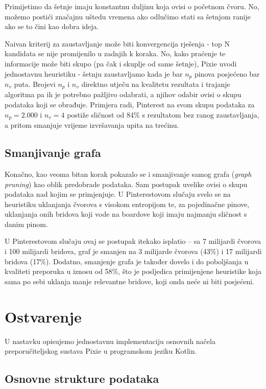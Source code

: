 \documentclass[times, utf8, seminar]{fer}
\begin{document}
Primijetimo da šetnje imaju konstantnu duljinu koja ovisi o početnom čvoru. No, možemo postići značajnu uštedu vremena ako odlučimo stati sa šetnjom ranije ako se to čini kao dobra ideja.

Naivan kriterij za zaustavljanje može biti konvergencija rješenja - top N kandidata se nije promijenilo u zadnjih k koraka. No, kako praćenje te informacije može biti skupo (pa čak i skuplje od same šetnje), Pixie uvodi jednostavnu heuristiku - šetnju zaustavljamo kada je bar $n_p$ pinova posjećeno bar $n_v$ puta. Brojevi $n_p$ i $n_v$ direktno utječu na kvalitetu rezultata i trajanje algoritma pa ih je potrebno pažljivo odabrati, a njihov odabir ovisi o skupu podataka koji se obrađuje. Primjera radi, Pinterest na svom skupu podataka za $n_p=2.000$ i $n_v=4$ postiže sličnost od 84\% s rezultatom bez ranog zaustavljanja, a pritom smanjuje vrijeme izvršavanja upita na trećinu.

\section{Smanjivanje grafa}

Konačno, kao veoma bitan korak pokazalo se i smanjivanje samog grafa (\textit{graph pruning}) kao oblik predobrade podataka. Sam postupak uvelike ovisi o skupu podataka nad kojim se primjenjuje. U Pinterestovom slučaju svelo se na heuristiku uklanjanja čvorova s visokom entropijom te, za pojedinačne pinove, uklanjanja onih bridova koji vode na boardove koji imaju najmanju sličnost s danim pinom.

U Pinterestovom slučaju ovaj se postupak itekako isplatio -- sa 7 milijardi čvorova i 100 milijardi bridova, graf je smanjen na 3 milijarde čvorova (43\%) i 17 milijardi bridova (17\%). Dodatno, smanjenje grafa je također dovelo i do poboljšanja u kvaliteti preporuka u iznosu od 58\%, što je posljedica primijenjene heuristike koja sama po sebi uklanja manje relevantne bridove, koji onda neće ni biti posjećeni.

\chapter{Ostvarenje}

U nastavku opisujemo jednostavnu implementaciju osnovnih načela preporučiteljskog sustava Pixie u programskom jeziku Kotlin.

\section{Osnovne strukture podataka}
\end{document}
